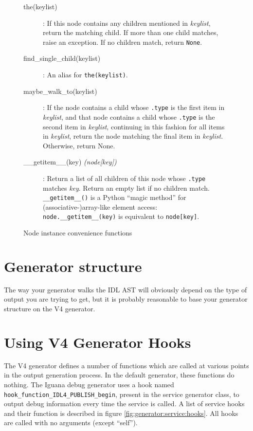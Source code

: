\begin{figure}
\begin{description}
\item[the(keylist)]: If this node contains any children mentioned in {\it keylist}, return the matching child. If more than one child matches, raise an exception. If no children match, return {\tt None}.
\item[find\_single\_child(keylist)]: An alias for {\tt the(keylist)}.
\item[maybe\_walk\_to(keylist)]: If the node contains a child whose {\tt .type} is the first item in {\it keylist}, and that node contains a child whose {\tt .type} is the second item in {\it keylist}, continuing in this fashion for all items in {\it keylist}, return the node matching the final item in {\it keylist}. Otherwise, return None.
\item[\_\_getitem\_\_(key) {\it (node[key])}]: Return a list of all children of this node whose {\tt .type} matches {\it key}. Return an empty list if no children match. {\tt \_\_getitem\_\_()} is a Python ``magic method'' for (associative-)array-like element access: {\tt node.\_\_getitem\_\_(key)} is equivalent to {\tt node[key]}.
\end{description}
\caption{Node instance convenience functions}
\label{fig:generator:node:functions}
\end{figure}

\section{Generator structure}
The way your generator walks the IDL AST will obviously depend on the type of output you are trying to get, but it is probably reasonable to base your generator structure on the V4 generator.

\section{Using V4 Generator Hooks}
The V4 generator defines a number of functions which are called at various points in the output generation process. In the default generator, these functions do nothing. The Iguana debug generator uses a hook named {\tt hook\_function\_IDL4\_PUBLISH\_begin}, present in the service generator class, to output debug information every time the service is called. A list of service hooks and their function is described in figure \ref{fig:generator:service:hooks}. All hooks are called with no arguments (except ``self'').

